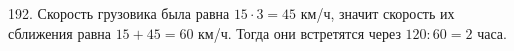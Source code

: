 192. Скорость грузовика была равна $15\cdot3=45$ км/ч, значит скорость их сближения равна $15+45=60$ км/ч. Тогда они встретятся через $120:60=2$ часа.\\
